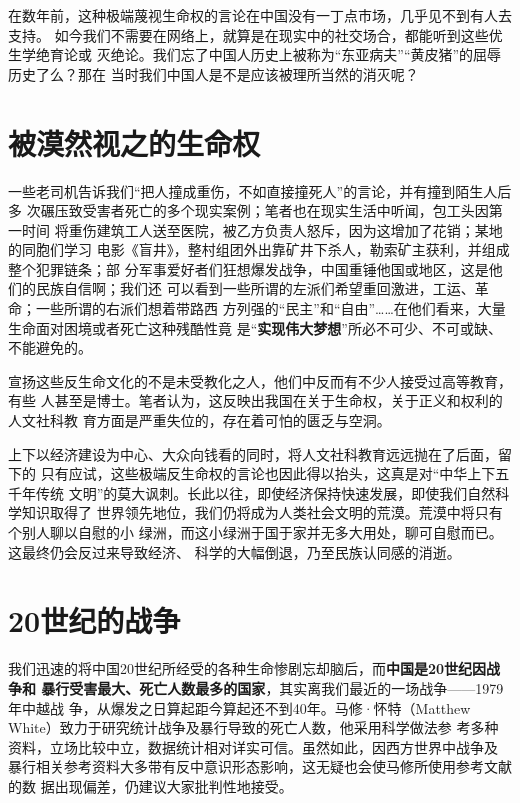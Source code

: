 在数年前，这种极端蔑视生命权的言论在中国没有一丁点市场，几乎见不到有人去支持。
如今我们不需要在网络上，就算是在现实中的社交场合，都能听到这些优生学绝育论或
灭绝论。我们忘了中国人历史上被称为“东亚病夫”“黄皮猪”的屈辱历史了么？那在
当时我们中国人是不是应该被理所当然的消灭呢？

\section{被漠然视之的生命权}

一些老司机告诉我们“把人撞成重伤，不如直接撞死人”的言论，并有撞到陌生人后多
次碾压致受害者死亡的多个现实案例；笔者也在现实生活中听闻，包工头因第一时间
将重伤建筑工人送至医院，被乙方负责人怒斥，因为这增加了花销；某地的同胞们学习
电影《盲井》，整村组团外出靠矿井下杀人，勒索矿主获利，并组成整个犯罪链条；部
分军事爱好者们狂想爆发战争，中国重锤他国或地区，这是他们的民族自信啊；我们还
可以看到一些所谓的左派们希望重回激进，工运、革命；一些所谓的右派们想着带路西
方列强的“民主”和“自由”……在他们看来，大量生命面对困境或者死亡这种残酷性竟
是“\textbf{实现伟大梦想}”所必不可少、不可或缺、不能避免的。

宣扬这些反生命文化的不是未受教化之人，他们中反而有不少人接受过高等教育，有些
人甚至是博士。笔者认为，这反映出我国在关于生命权，关于正义和权利的人文社科教
育方面是严重失位的，存在着可怕的匮乏与空洞。

上下以经济建设为中心、大众向钱看的同时，将人文社科教育远远抛在了后面，留下的
只有应试，这些极端反生命权的言论也因此得以抬头，这真是对“中华上下五千年传统
文明”的莫大讽刺。长此以往，即使经济保持快速发展，即使我们自然科学知识取得了
世界领先地位，我们仍将成为人类社会文明的荒漠。荒漠中将只有个别人聊以自慰的小
绿洲，而这小绿洲于国于家并无多大用处，聊可自慰而已。这最终仍会反过来导致经济、
科学的大幅倒退，乃至民族认同感的消逝。

\section{20世纪的战争}

我们迅速的将中国20世纪所经受的各种生命惨剧忘却脑后，而\textbf{中国是20世纪因战争和
  暴行受害最大、死亡人数最多的国家}，其实离我们最近的一场战争——1979年中越战
争，从爆发之日算起距今算起还不到40年。马修·怀特（Matthew
White）\cite{mattwhite}致力于研究统计战争及暴行导致的死亡人数，他采用科学做法参
考多种资料，立场比较中立，数据统计相对详实可信。虽然如此，因西方世界中战争及
暴行相关参考资料大多带有反中意识形态影响，这无疑也会使马修所使用参考文献的数
据出现偏差，仍建议大家批判性地接受。

